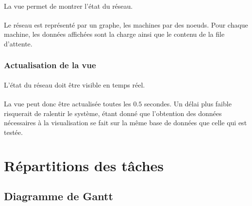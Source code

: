 \documentclass[12pt]{article}
\begin{document}
\paragraph{} La vue permet de montrer l'état du réseau.

\paragraph{} Le réseau est représenté par un graphe, les machines par des noeuds. 
Pour chaque machine, les données affichées sont la charge ainsi que le contenu de la file d'attente.

\subsubsection{Actualisation de la vue}

\paragraph{} L'état du réseau doit être visible en temps réel.

\paragraph{} La vue peut donc être actualisée toutes les $0.5$ secondes. 
Un délai plus faible risquerait de ralentir le système, étant donné que l'obtention des données nécessaires à la visualisation se fait sur la même base de données que celle qui est testée.


\newpage
\section{Répartitions des tâches}

\subsection{Diagramme de Gantt}
\end{document}
